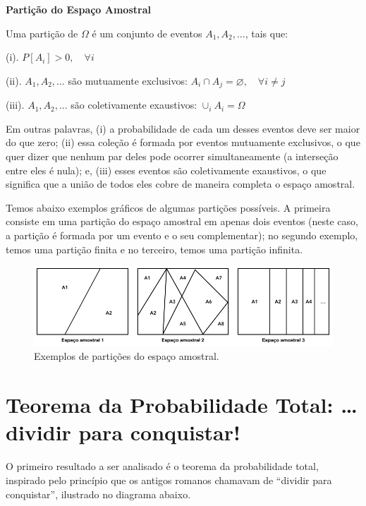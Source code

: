 \documentclass[
]{book}
\theoremstyle{definition}
\theoremstyle{definition}
\theoremstyle{definition}
\theoremstyle{remark}
\begin{document}
\textbf{Partição do Espaço Amostral}

Uma partição de \({\Omega}\) é um conjunto de eventos \({A_1, A_2, \ldots}\), tais que:

(i). \({P[A_i] > 0, \quad \forall i}\)

(ii). \({A_1, A_2, \ldots}\) são mutuamente exclusivos: \({A_i \cap A_j = \varnothing, \quad \forall i\neq j}\)

(iii). \({A_1, A_2, \ldots}\) são coletivamente exaustivos: \({\cup_{i} A_i = \Omega}\)

Em outras palavras, (i) a probabilidade de cada um desses eventos deve ser maior do que zero; (ii) essa coleção é formada por eventos mutuamente exclusivos, o que quer dizer que nenhum par deles pode ocorrer simultaneamente (a interseção entre eles é nula); e, (iii) esses eventos são coletivamente exaustivos, o que significa que a união de todos eles cobre de maneira completa o espaço amostral.

Temos abaixo exemplos gráficos de algumas partições possíveis. A primeira consiste em uma partição do espaço amostral em apenas dois eventos (neste caso, a partição é formada por um evento e o seu complementar); no segundo exemplo, temos uma partição finita e no terceiro, temos uma partição infinita.

\begin{figure}
\includegraphics[width=1\linewidth]{img/particao} \caption{Exemplos de partições do espaço amostral.}\label{fig:ch4-particao}
\end{figure}

\hypertarget{teorema-da-probabilidade-total-dividir-para-conquistar}{%
\section{Teorema da Probabilidade Total: \ldots dividir para conquistar!}\label{teorema-da-probabilidade-total-dividir-para-conquistar}}

O primeiro resultado a ser analisado é o teorema da probabilidade total, inspirado pelo princípio que os antigos romanos chamavam de ``dividir para conquistar'', ilustrado no diagrama abaixo.
\end{document}
